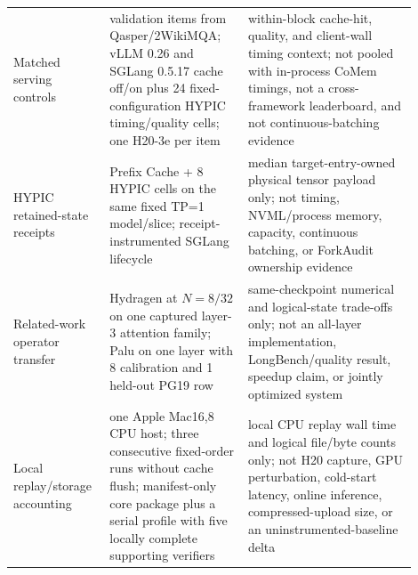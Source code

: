 \documentclass{article}
\begin{document}
\begin{longtable}{@{}>{\raggedright\arraybackslash}p{0.19\linewidth}>{\raggedright\arraybackslash}p{0.32\linewidth}>{\raggedright\arraybackslash}p{0.39\linewidth}@{}}
  Matched serving controls & 8 validation items from Qasper/2WikiMQA; vLLM 0.26 and SGLang 0.5.17 cache off/on plus 24 fixed-configuration HYPIC timing/quality cells; one H20-3e per item & within-block cache-hit, quality, and client-wall timing context; not pooled with in-process CoMem timings, not a cross-framework leaderboard, and not continuous-batching evidence \\
  HYPIC retained-state receipts & 8 Prefix Cache + 8 HYPIC cells on the same fixed TP=1 model/slice; receipt-instrumented SGLang lifecycle & median target-entry-owned physical tensor payload only; not timing, NVML/process memory, capacity, continuous batching, or ForkAudit ownership evidence \\
  Related-work operator transfer & Hydragen at $N=8/32$ on one captured layer-3 attention family; Palu on one layer with 8 calibration and 1 held-out PG19 row & same-checkpoint numerical and logical-state trade-offs only; not an all-layer implementation, LongBench/quality result, speedup claim, or jointly optimized system \\
  Local replay/storage accounting & one Apple Mac16,8 CPU host; three consecutive fixed-order runs without cache flush; manifest-only core package plus a serial profile with five locally complete supporting verifiers & local CPU replay wall time and logical file/byte counts only; not H20 capture, GPU perturbation, cold-start latency, online inference, compressed-upload size, or an uninstrumented-baseline delta \\
\end{longtable}
\endgroup
\end{document}
